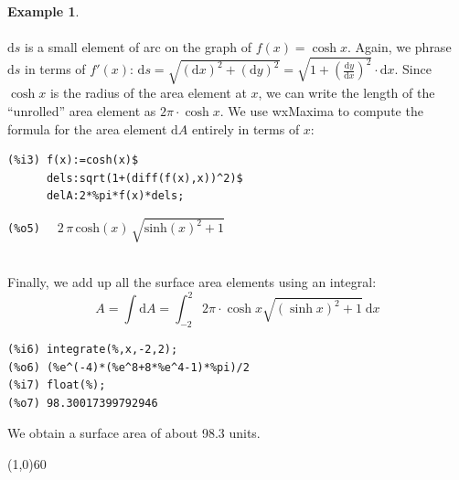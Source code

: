 \documentclass[10.5pt,twoside]{report}
\theoremstyle{definition}
\newtheorem{exmp}{Example}[section]
\begin{document}
\begin{exmp}
${}$\\
${}$\\

$\mathrm{d}s$ is a small element of arc on the graph of $f(x)=\cosh{x}$.  Again, we phrase $\mathrm{d}s$ in terms of $f'(x)$: $\mathrm{d}s=\sqrt{(\mathrm{d}x)^2+(\mathrm{d}y)^2}
=\sqrt{1+(\frac{\mathrm{d}y}{\mathrm{d}x})^2}\cdot \mathrm{d}x$.  Since $\cosh{x}$ is the radius of the area element at $x$, we can write the length of the ``unrolled'' area element as $2\pi\cdot \cosh{x}$.  We use wxMaxima to compute the formula for the area element $\mathrm{d}A$ entirely in terms of $x$:

\begin{verbatim}
(%i3) f(x):=cosh(x)$
      dels:sqrt(1+(diff(f(x),x))^2)$
      delA:2*%pi*f(x)*dels;
\end{verbatim}
\verb|(%o5)  | $2\,\pi \,\mathrm{cosh}\left( x\right) \,\sqrt{{\mathrm{sinh}\left( x\right) }^{2}+1}$

${}$\\

Finally, we add up all the surface area elements using an integral:  \[A=\int \mathrm{d}A= \int_{-2}^{2} 2\pi\cdot \cosh{x} \sqrt{(\sinh{x})^2+1}\ \mathrm{d}x\]

\begin{verbatim}
(%i6) integrate(%,x,-2,2);
(%o6) (%e^(-4)*(%e^8+8*%e^4-1)*%pi)/2
(%i7) float(%);
(%o7) 98.30017399792946
\end{verbatim}

We obtain a surface area of about 98.3 units.

\end{exmp}

\line(1,0){60}
\linethickness{0.5mm}
\end{document}
